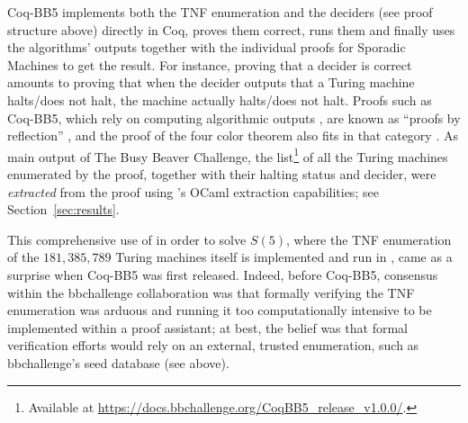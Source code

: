 \documentclass[a4paper,british]{article}
\theoremstyle{definition} %
\numberwithin{equation}{section}
\theoremstyle{definition} %
\newcommand{\BBtheFifthTNF}{181{,}385{,}789}
\newcommand{\CoqBB}{Coq-BB5\xspace}
\begin{document}
\CoqBB implements both the TNF enumeration and the deciders (see proof structure above) directly in Coq, proves them correct, runs them and finally uses the algorithms' outputs together with the individual proofs for Sporadic Machines to get the result. For instance, proving that a decider is correct amounts to proving that when the decider outputs that a Turing machine halts/does not halt, the machine actually halts/does not halt. Proofs such as \CoqBB, which rely on computing algorithmic outputs \cite{vmcompute,nativecompute}, are known as ``proofs by reflection'' \cite{boutin1997using}, and the \Coq proof of the four color theorem also fits in that category \cite{gonthier2010introduction}. As main output of The Busy Beaver Challenge, the list\footnote{Available at \url{https://docs.bbchallenge.org/CoqBB5_release_v1.0.0/}.} of all the Turing machines enumerated by the \Coq proof, together with their halting status and decider, were \textit{extracted} from the proof using \Coq's OCaml extraction capabilities; see Section~\ref{sec:results}.


This comprehensive use of \Coq in order to solve $S(5)$, where the TNF enumeration of the $\BBtheFifthTNF$ Turing machines itself is implemented and run in \Coq, came as a surprise when \CoqBB was first released. Indeed, before \CoqBB, consensus within the bbchallenge collaboration  was that formally verifying the TNF enumeration was arduous and running it too computationally intensive to be implemented within a proof assistant; at best, the belief was that formal verification efforts would rely on an external, trusted enumeration, such as bbchallenge's seed database (see above).

\end{document}
